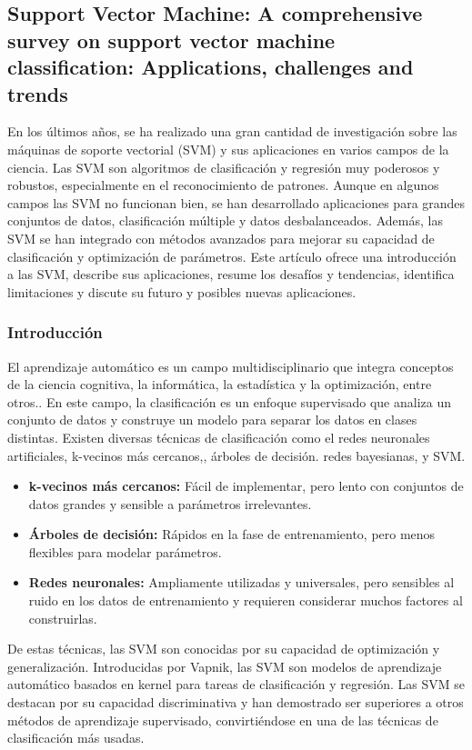 \subsection{Support Vector Machine: A comprehensive survey on support vector machine classification: Applications, challenges and trends \citep*{tecnica3}}
En los últimos años, se ha realizado una gran cantidad de investigación sobre las máquinas de soporte vectorial (SVM) y sus aplicaciones en varios campos de la ciencia. Las SVM son algoritmos de clasificación y regresión muy poderosos y robustos, especialmente en el reconocimiento de patrones. Aunque en algunos campos las SVM no funcionan bien, se han desarrollado aplicaciones para grandes conjuntos de datos, clasificación múltiple y datos desbalanceados. Además, las SVM se han integrado con métodos avanzados para mejorar su capacidad de clasificación y optimización de parámetros. Este artículo ofrece una introducción a las SVM, describe sus aplicaciones, resume los desafíos y tendencias, identifica limitaciones y discute su futuro y posibles nuevas aplicaciones.
\subsubsection{Introducción}
El aprendizaje automático es un campo multidisciplinario que integra conceptos de la ciencia cognitiva, la informática, la estadística y la optimización, entre otros.. En este campo, la clasificación es un enfoque supervisado que analiza un conjunto de datos y construye un modelo para separar los datos en clases distintas. Existen diversas técnicas de clasificación como el redes neuronales artificiales, k-vecinos más cercanos,, árboles de decisión. redes bayesianas,  y SVM.

\begin{itemize}
	\item \textbf{k-vecinos más cercanos:} Fácil de implementar, pero lento con conjuntos de datos grandes y sensible a parámetros irrelevantes.
	\item \textbf{Árboles de decisión:} Rápidos en la fase de entrenamiento, pero menos flexibles para modelar parámetros.
	\item \textbf{ Redes neuronales:} Ampliamente utilizadas y universales, pero sensibles al ruido en los datos de entrenamiento y requieren considerar muchos factores al construirlas.
\end{itemize}
De estas técnicas, las SVM son conocidas por su capacidad de optimización y generalización. Introducidas por Vapnik, las SVM son modelos de aprendizaje automático basados en kernel para tareas de clasificación y regresión. Las SVM se destacan por su capacidad discriminativa y han demostrado ser superiores a otros métodos de aprendizaje supervisado, convirtiéndose en una de las técnicas de clasificación más usadas.

